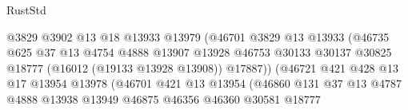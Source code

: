 \begin{lexlean}{RustStd}
\begin{coremodule}
                                            @3829
                                            @3902
                                            @13
                                            @18
                                            @13933
                                            @13979
                                            (@46701
                                              @3829
                                              @13
                                              @13933
                                              (@46735
                                                @625
                                                @37
                                                @13
                                                @4754
                                                @4888
                                                @13907
                                                @13928
                                                @46753
                                                @30133
                                                @30137
                                                @30825
                                                @18777
                                                (@16012 (@19133 @13928 @13908))
                                                @17887))
                                            (@46721
                                              @421
                                              @428
                                              @13
                                              @17
                                              @13954
                                              @13978
                                              (@46701
                                                @421
                                                @13
                                                @13954
                                                (@46860
                                                  @131
                                                  @37
                                                  @13
                                                  @4787
                                                  @4888
                                                  @13938
                                                  @13949
                                                  @46875
                                                  @46356
                                                  @46360
                                                  @30581
                                                  @18777

\end{coremodule}
\end{lexlean}
